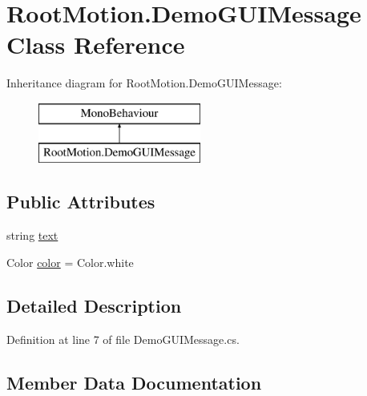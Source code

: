 \hypertarget{class_root_motion_1_1_demo_g_u_i_message}{}\section{Root\+Motion.\+Demo\+G\+U\+I\+Message Class Reference}
\label{class_root_motion_1_1_demo_g_u_i_message}
Inheritance diagram for Root\+Motion.\+Demo\+G\+U\+I\+Message\+:\begin{figure}[H]
\begin{center}
\leavevmode
\includegraphics[height=2.000000cm]{class_root_motion_1_1_demo_g_u_i_message}
\end{center}
\end{figure}
\subsection*{Public Attributes}
\begin{DoxyCompactItemize}
\item 
string \mbox{\hyperlink{class_root_motion_1_1_demo_g_u_i_message_aaedb46359c656929d96a8e1b76a17065}{text}}
\item 
Color \mbox{\hyperlink{class_root_motion_1_1_demo_g_u_i_message_a390ca9794a9ce212e876704a5c1f5257}{color}} = Color.\+white
\end{DoxyCompactItemize}


\subsection{Detailed Description}


Definition at line 7 of file Demo\+G\+U\+I\+Message.\+cs.



\subsection{Member Data Documentation}
\mbox{\label{class_root_motion_1_1_demo_g_u_i_message_a390ca9794a9ce212e876704a5c1f5257}} 
